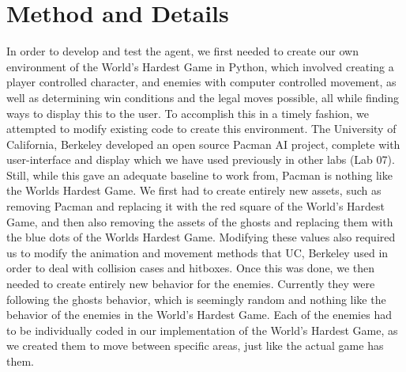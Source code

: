 \documentclass[11pt]{article}
\begin{document}
\section{Method and Details}


In order to develop and test the agent, we first needed to create our own environment of the World's Hardest Game in Python, which involved creating a player controlled character, and enemies with computer controlled movement, as well as determining win conditions and the legal moves possible, all while finding ways to display this to the user. To accomplish this in a timely fashion, we attempted to modify existing code to create this environment. The University of California, Berkeley developed an open source Pacman AI project, complete with user-interface and display which we have used previously in other labs (Lab 07). Still, while this gave an adequate baseline to work from, Pacman is nothing like the Worlds Hardest Game. We first had to create entirely new assets, such as removing Pacman and replacing it with the red square of the World's Hardest Game, and then also removing the assets of the ghosts and replacing them with the blue dots of the Worlds Hardest Game. Modifying these values also required us to modify the animation and movement methods that UC, Berkeley used in order to deal with collision cases and hitboxes. Once this was done, we then needed to create entirely new behavior for the enemies. Currently they were following the ghosts behavior, which is seemingly random and nothing like the behavior of the enemies in the World's Hardest Game. Each of the enemies had to be individually coded in our implementation of the World's Hardest Game, as we created them to move between specific areas, just like the actual game has them.
\end{document}
